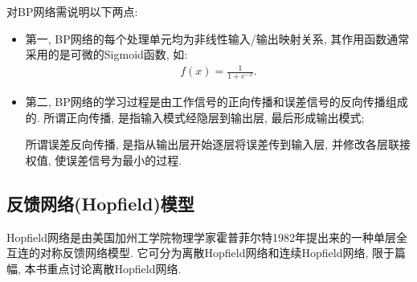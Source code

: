 对BP网络需说明以下两点:
\begin{itemize}
\item 第一, BP网络的每个处理单元均为非线性输入/输出映射关系, 其作用函数通常采用的是可微的Sigmoid函数, 如:
\begin{align}
    f(x)=\frac{1}{1+e^{-x}}.
\end{align}
\item 第二, BP网络的学习过程是由工作信号的正向传播和误差信号的反向传播组成的. 所谓正向传播, 是指输入模式经隐层到输出层, 最后形成输出模式;
\begin{remark}
    所谓误差反向传播, 是指从输出层开始逐层将误差传到输入层, 并修改各层联接权值, 使误差信号为最小的过程.
\end{remark}
\end{itemize}
\subsection{反馈网络(Hopfield)模型}
Hopfield网络是由美国加州工学院物理学家霍普菲尔特1982年提出来的一种单层全互连的对称反馈网络模型. 它可分为离散Hopfield网络和连续Hopfield网络, 限于篇幅, 本书重点讨论离散Hopfield网络.
